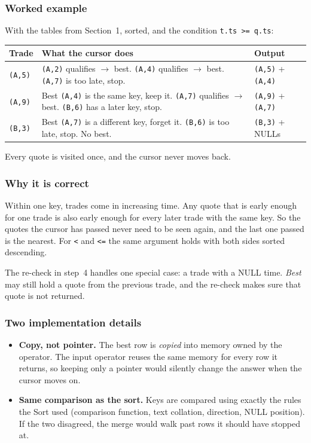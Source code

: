 \documentclass[11pt,a4paper]{article}
\newcommand{\code}[1]{\texttt{#1}}
\begin{document}
\subsubsection{Worked example}

With the tables from Section~1, sorted, and the condition \code{t.ts >= q.ts}:

\begin{center}
\begin{tabular}{@{}lp{8.5cm}l@{}}
\toprule
Trade & What the cursor does & Output \\
\midrule
\code{(A,5)} & \code{(A,2)} qualifies $\to$ best. \code{(A,4)} qualifies $\to$ best.
               \code{(A,7)} is too late, stop. & \code{(A,5)} + \code{(A,4)} \\
\code{(A,9)} & Best \code{(A,4)} is the same key, keep it. \code{(A,7)} qualifies $\to$
               best. \code{(B,6)} has a later key, stop. & \code{(A,9)} + \code{(A,7)} \\
\code{(B,3)} & Best \code{(A,7)} is a different key, forget it. \code{(B,6)} is too late,
               stop. No best. & \code{(B,3)} + NULLs \\
\bottomrule
\end{tabular}
\end{center}

Every quote is visited once, and the cursor never moves back.

\subsubsection{Why it is correct}

Within one key, trades come in increasing time. Any quote that is early enough for one
trade is also early enough for every later trade with the same key. So the quotes the
cursor has passed never need to be seen again, and the last one passed is the nearest.
For \code{<} and \code{<=} the same argument holds with both sides sorted descending.

The re-check in step~4 handles one special case: a trade with a NULL time. \emph{Best}
may still hold a quote from the previous trade, and the re-check makes sure that quote is
not returned.

\subsubsection{Two implementation details}

\begin{itemize}
  \item \textbf{Copy, not pointer.} The best row is \emph{copied} into memory owned by
        the operator. The input operator reuses the same memory for every row it
        returns, so keeping only a pointer would silently change the answer when the
        cursor moves on.
  \item \textbf{Same comparison as the sort.} Keys are compared using exactly the rules
        the Sort used (comparison function, text collation, direction, NULL position).
        If the two disagreed, the merge would walk past rows it should have stopped at.
\end{itemize}
\end{document}
